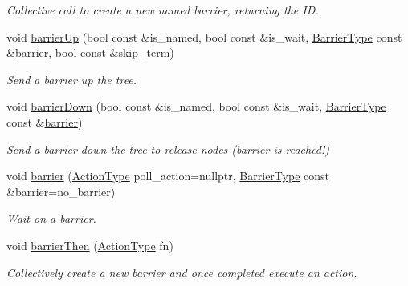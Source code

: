\begin{DoxyCompactItemize}
\begin{DoxyCompactList}\small\item\em Collective call to create a new named barrier, returning the ID. \end{DoxyCompactList}\item 
void \hyperlink{structvt_1_1collective_1_1barrier_1_1_barrier_a79096d77724cb095c08696e8af673dfb}{barrier\+Up} (bool const \&is\+\_\+named, bool const \&is\+\_\+wait, \hyperlink{namespacevt_a25e481f0d6bbc7204db23d1c87a62e77}{Barrier\+Type} const \&\hyperlink{structvt_1_1collective_1_1barrier_1_1_barrier_a05124050c7d353a4f3475ee1875dd46a}{barrier}, bool const \&skip\+\_\+term)
\begin{DoxyCompactList}\small\item\em Send a barrier up the tree. \end{DoxyCompactList}\item 
void \hyperlink{structvt_1_1collective_1_1barrier_1_1_barrier_a962a1cbd78c359e1dee7a8e7df5cfd75}{barrier\+Down} (bool const \&is\+\_\+named, bool const \&is\+\_\+wait, \hyperlink{namespacevt_a25e481f0d6bbc7204db23d1c87a62e77}{Barrier\+Type} const \&\hyperlink{structvt_1_1collective_1_1barrier_1_1_barrier_a05124050c7d353a4f3475ee1875dd46a}{barrier})
\begin{DoxyCompactList}\small\item\em Send a barrier down the tree to release nodes (barrier is reached!) \end{DoxyCompactList}\item 
void \hyperlink{structvt_1_1collective_1_1barrier_1_1_barrier_a05124050c7d353a4f3475ee1875dd46a}{barrier} (\hyperlink{namespacevt_ae0a5a7b18cc99d7b732cb4d44f46b0f3}{Action\+Type} poll\+\_\+action=nullptr, \hyperlink{namespacevt_a25e481f0d6bbc7204db23d1c87a62e77}{Barrier\+Type} const \&barrier=no\+\_\+barrier)
\begin{DoxyCompactList}\small\item\em Wait on a barrier. \end{DoxyCompactList}\item 
void \hyperlink{structvt_1_1collective_1_1barrier_1_1_barrier_a21adace64047e0e773fb4b55846aab2e}{barrier\+Then} (\hyperlink{namespacevt_ae0a5a7b18cc99d7b732cb4d44f46b0f3}{Action\+Type} fn)
\begin{DoxyCompactList}\small\item\em Collectively create a new barrier and once completed execute an action. \end{DoxyCompactList}\item 

\end{DoxyCompactItemize}
